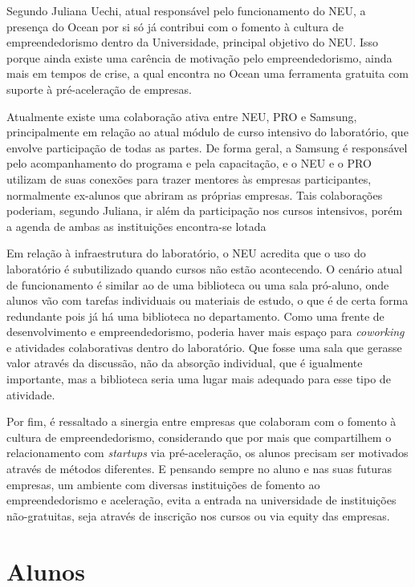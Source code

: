 Segundo Juliana Uechi, atual responsável pelo funcionamento do NEU, a presença do Ocean por si só já contribui com o fomento à cultura de empreendedorismo dentro da Universidade, principal objetivo do NEU. Isso porque ainda existe uma carência de motivação pelo empreendedorismo, ainda mais em tempos de crise, a qual encontra no Ocean uma ferramenta gratuita com suporte à pré-aceleração de empresas. 

Atualmente existe uma colaboração ativa entre NEU, PRO e Samsung, principalmente em relação ao atual módulo de curso intensivo do laboratório, que envolve participação de todas as partes. De forma geral, a Samsung é responsável pelo acompanhamento do programa e pela capacitação, e o NEU e o PRO utilizam de suas conexões para trazer mentores às empresas participantes, normalmente ex-alunos que abriram as próprias empresas. Tais colaborações poderiam, segundo Juliana, ir além da participação nos cursos intensivos, porém a agenda de ambas as instituições encontra-se lotada

Em relação à infraestrutura do laboratório, o NEU acredita que o uso do laboratório é subutilizado quando cursos não estão acontecendo. O cenário atual de funcionamento é similar ao de uma biblioteca ou uma sala pró-aluno, onde alunos vão com tarefas individuais ou materiais de estudo, o que é de certa forma redundante pois já há uma biblioteca no departamento. Como uma frente de desenvolvimento e empreendedorismo, poderia haver mais espaço para \textit{coworking} e atividades colaborativas dentro do laboratório. Que fosse uma sala que gerasse valor através da discussão, não da absorção individual, que é igualmente importante, mas a biblioteca seria uma lugar mais adequado para esse tipo de atividade.

Por fim, é ressaltado a sinergia entre empresas que colaboram com o fomento à cultura de empreendedorismo, considerando que por mais que compartilhem o relacionamento com \textit{startups} via pré-aceleração, os alunos precisam ser motivados através de métodos diferentes. E pensando sempre no aluno e nas suas futuras empresas, um ambiente com diversas instituições de fomento ao empreendedorismo e aceleração, evita a entrada na universidade de instituições não-gratuitas, seja através de inscrição nos cursos ou via equity das empresas.

\section{Alunos}

